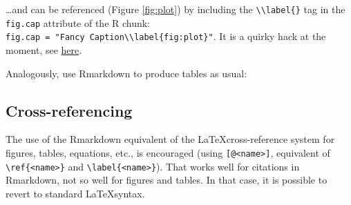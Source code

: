 \documentclass[AMA,STIX1COL,]{WileyNJD-v2}
\begin{document}
\ldots and can be referenced (Figure \ref{fig:plot}) by including the
\texttt{\textbackslash{}\textbackslash{}label\{\}} tag in the
\texttt{fig.cap} attribute of the R chunk:
\texttt{fig.cap\ =\ "Fancy\ Caption\textbackslash{}\textbackslash{}label\{fig:plot\}"}.
It is a quirky hack at the moment, see
\href{https://github.com/yihui/knitr/issues/323}{here}.

Analogously, use Rmarkdown to produce tables as usual:

\hypertarget{cross-referencing}{%
\subsection{Cross-referencing}\label{cross-referencing}}

The use of the Rmarkdown equivalent of the \LaTeX cross-reference system
for figures, tables, equations, etc., is encouraged (using
\texttt{{[}@\textless{}name\textgreater{}{]}}, equivalent of
\texttt{\textbackslash{}ref\{\textless{}name\textgreater{}\}} and
\texttt{\textbackslash{}label\{\textless{}name\textgreater{}\}}). That
works well for citations in Rmarkdown, not so well for figures and
tables. In that case, it is possible to revert to standard
\LaTeX syntax.


\end{document}
